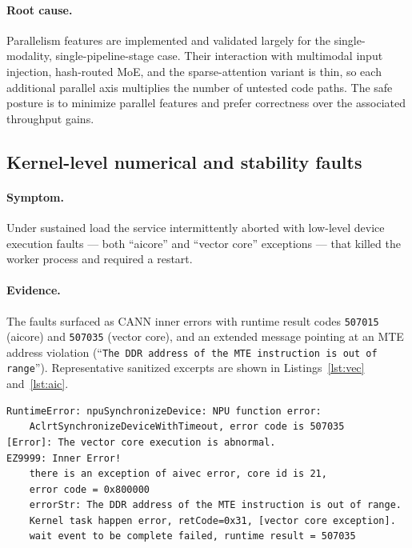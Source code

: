 \documentclass{article}
\newcommand{\code}[1]{\texttt{#1}}
\begin{document}
\paragraph{Root cause.} Parallelism features are implemented and validated largely
for the single-modality, single-pipeline-stage case. Their interaction with
multimodal input injection, hash-routed MoE, and the sparse-attention variant is
thin, so each additional parallel axis multiplies the number of untested code
paths. The safe posture is to minimize parallel features and prefer correctness
over the associated throughput gains.

\subsection{Kernel-level numerical and stability faults}
\label{sec:kernel}
\paragraph{Symptom.} Under sustained load the service intermittently aborted with
low-level device execution faults --- both ``aicore'' and ``vector core''
exceptions --- that killed the worker process and required a restart.

\paragraph{Evidence.} The faults surfaced as CANN inner errors with runtime result
codes \code{507015} (aicore) and \code{507035} (vector core), and an extended
message pointing at an MTE address violation (``\code{The DDR address of the MTE
instruction is out of range}''). Representative sanitized excerpts are shown in
Listings~\ref{lst:vec} and~\ref{lst:aic}.

\begin{lstlisting}[caption={Vector-core execution fault (runtime result 507035).},label={lst:vec}]
RuntimeError: npuSynchronizeDevice: NPU function error:
    AclrtSynchronizeDeviceWithTimeout, error code is 507035
[Error]: The vector core execution is abnormal.
EZ9999: Inner Error!
    there is an exception of aivec error, core id is 21,
    error code = 0x800000
    errorStr: The DDR address of the MTE instruction is out of range.
    Kernel task happen error, retCode=0x31, [vector core exception].
    wait event to be complete failed, runtime result = 507035
\end{lstlisting}
\end{document}
